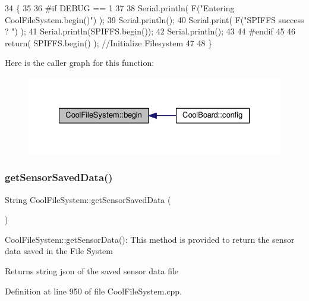 \begin{DoxyCode}
34 \{
35 
36 \textcolor{preprocessor}{#if DEBUG == 1}
37 
38     Serial.println( F(\textcolor{stringliteral}{"Entering CoolFileSystem.begin()"}) );
39     Serial.println();   
40     Serial.print( F(\textcolor{stringliteral}{"SPIFFS success ? "}) );
41     Serial.println(SPIFFS.begin());
42     Serial.println();
43 
44 \textcolor{preprocessor}{#endif}
45 
46     \textcolor{keywordflow}{return}( SPIFFS.begin() );                                   \textcolor{comment}{//Initialize Filesystem}
47 
48 \}
\end{DoxyCode}
Here is the caller graph for this function\+:\nopagebreak
\begin{figure}[H]
\begin{center}
\leavevmode
\includegraphics[width=327pt]{classCoolFileSystem_a6ba6f666ed4c530174f8569d2c636748_icgraph}
\end{center}
\end{figure}
\mbox{\label{classCoolFileSystem_a5c58bca3735c0ed3efb268d70ef998ef}} 
\subsubsection{\texorpdfstring{get\+Sensor\+Saved\+Data()}{getSensorSavedData()}}
{\footnotesize\ttfamily String Cool\+File\+System\+::get\+Sensor\+Saved\+Data (\begin{DoxyParamCaption}{ }\end{DoxyParamCaption})}

Cool\+File\+System\+::get\+Sensor\+Data()\+: This method is provided to return the sensor data saved in the File System

\begin{DoxyReturn}{Returns}
string json of the saved sensor data file 
\end{DoxyReturn}


Definition at line 950 of file Cool\+File\+System.\+cpp.



